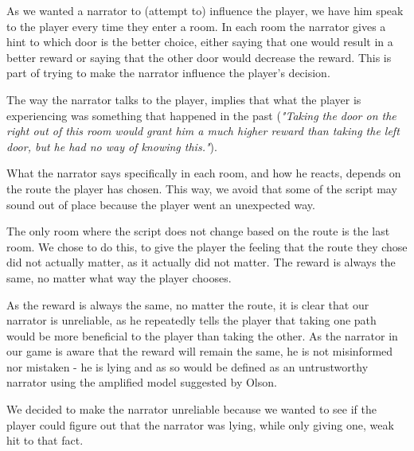 As we wanted a narrator to (attempt to) influence the player, we have him speak to the player every time they enter a room. In each room the narrator gives a hint to which door is the better choice, either saying that one would result in a better reward or saying that the other door would decrease the reward. This is part of trying to make the narrator influence the player's decision. 

The way the narrator talks to the player, implies that what the player is experiencing was something that happened in the past (\textit{"Taking the door on the right out of this room would grant him a much higher reward than taking the left door, but he had no way of knowing this."}).

What the narrator says specifically in each room, and how he reacts, depends on the route the player has chosen. This way, we avoid that some of the script may sound out of place because the player went an unexpected way.

The only room where the script does not change based on the route is the last room. We chose to do this, to give the player the feeling that the route they chose did not actually matter, as it actually did not matter. The reward is always the same, no matter what way the player chooses.

As the reward is always the same, no matter the route, it is clear that our narrator is unreliable, as he repeatedly tells the player that taking one path would be more beneficial to the player than taking the other. As the narrator in our game is aware that the reward will remain the same, he is not misinformed nor mistaken - he is lying and as so would be defined as an untrustworthy narrator using the amplified model suggested by Olson.

We decided to make the narrator unreliable because we wanted to see if the player could figure out that the narrator was lying, while only giving one, weak hit to that fact.